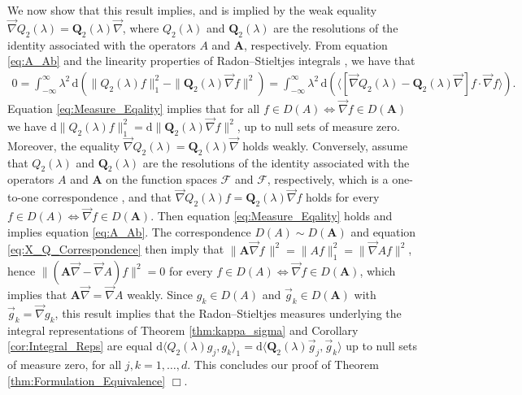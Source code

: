 \documentclass[11pt]{amsart}
\renewcommand{\d}{\mathrm{d}}
\newcommand{\Ab}{\mathbf{A}}
\newcommand{\Qb}{\mathbf{Q}}
\newcommand{\Fc}{\mathcal{F}}
\newcommand{\Fs}{\mathscr{F}}
\begin{document}
We now show that this result implies, and is implied by the weak
equality $\vec{\nabla}Q_2(\lambda)=\Qb_2(\lambda)\vec{\nabla}$, where
$Q_2(\lambda)$ and $\Qb_2(\lambda)$ are the resolutions of the identity associated
with the operators $A$ and $\Ab$, respectively. From equation
\eqref{eq:A_Ab} and the linearity properties of  Radon--Stieltjes
integrals \cite{Stone:64}, we have that   
%
\begin{align}\label{eq:Measure_Eqality}
  0=\int_{-\infty}^\infty\lambda^2\,\d(\|Q_2(\lambda)f\|_1^2-\|\Qb_2(\lambda)\vec{\nabla}f\|^2)
   =\int_{-\infty}^\infty\lambda^2\,\d(\langle[\vec{\nabla}Q_2(\lambda)-\Qb_2(\lambda)\vec{\nabla}]f\cdot\vec{\nabla}f\rangle).
\end{align}
%
Equation \eqref{eq:Measure_Eqality} implies that for all
$f\in D(A)\iff\vec{\nabla}f\in D(\Ab)$ we have
$\d\|Q_2(\lambda)f\|_1^2=\d\|\Qb_2(\lambda)\vec{\nabla}f\|^2$, up to null sets of measure
zero. Moreover, the equality $\vec{\nabla}Q_2(\lambda)=\Qb_2(\lambda)\vec{\nabla}$ holds
weakly. Conversely, assume that $Q_2(\lambda)$ and 
$\Qb_2(\lambda)$ are the resolutions of the identity associated with the
operators $A$ and $\Ab$ on the function spaces $\Fc$ and $\Fs$,
respectively, which is a one-to-one correspondence \cite{Stone:64},
and that $\vec{\nabla}Q_2(\lambda)f=\Qb_2(\lambda)\vec{\nabla}f$ 
holds for every $f\in D(A)\iff\vec{\nabla}f\in D(\Ab)$. Then equation
\eqref{eq:Measure_Eqality} holds and implies equation
\eqref{eq:A_Ab}. The correspondence $D(A)\sim D(\Ab)$ and equation
\eqref{eq:X_Q_Correspondence} then imply that
$\|\Ab\vec{\nabla}f\,\|^2=\|Af\|_1^2=\|\vec{\nabla}Af\|^2$, hence
$\|(\Ab\vec{\nabla}-\vec{\nabla}A)f\|^2=0$ for every $f\in D(A)\iff\vec{\nabla}f\in D(\Ab)$,
which implies that $\Ab\vec{\nabla}=\vec{\nabla}A$ weakly. Since $g_k\in D(A)$ and
$\vec{g}_k\in D(\Ab)$ with $\vec{g}_k=\vec{\nabla}g_k$, this result implies
that the Radon--Stieltjes measures underlying the integral
representations of Theorem \ref{thm:kappa_sigma} and Corollary
\ref{cor:Integral_Reps} are equal
$\d\langle Q_2(\lambda)g_j,g_k\rangle_1=\d\langle\Qb_2(\lambda)\vec{g}_j,\vec{g}_k\rangle$ up to null sets
of measure zero, for all $j,k=1,\ldots,d$. This concludes our proof of
Theorem \ref{thm:Formulation_Equivalence} $\Box$.    
\end{document}
